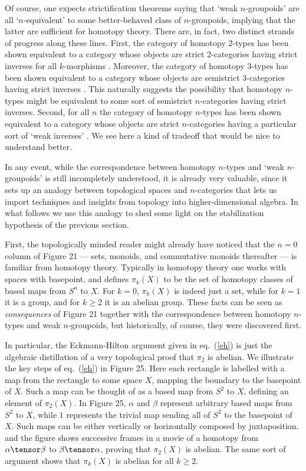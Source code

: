 Of course, one expects strictification theorems saying that `weak
$n$-groupoids' are all `$n$-equivalent' to some better-behaved class of
$n$-groupoids, implying that the latter are sufficient for homotopy
theory.  There are, in fact, two distinct strands of progress along
these lines.  First, the category of homotopy $2$-types has been shown
equivalent to a category whose objects are strict 2-categories having
strict inverses for all $k$-morphisms \cite{BS,MW}.  Moreover, the
category of homotopy 3-types has been shown equivalent to a category
whose objects are semistrict 3-categories having strict inverses
\cite{JT,Leroy}.  This naturally suggests the possibility that homotopy
$n$-types might be equivalent to some sort of semistrict $n$-categories
having strict inverses.  Second, for all $n$ the category of homotopy
$n$-types has been shown equivalent to a category whose objects are
strict $n$-categories having a particular sort of `weak inverses'
\cite{KVinfinity}.  We see here a kind of tradeoff that would be nice to
understand better.

In any event, while the correspondence between homotopy $n$-types
and `weak $n$-groupoids' is still incompletely understood,
it is already very valuable, since it sets up an analogy between
topological spaces and $n$-categories that lets us import
techniques and insights from topology into higher-dimensional
algebra. In what follows we use this analogy to shed some light
on the stabilization hypothesis of the previous section.

First, the topologically minded reader might already have noticed
that the $n = 0$ column of Figure 21 --- sets, monoids, and
commutative monoids thereafter --- is familiar from homotopy
theory.  Typically in homotopy theory one works with spaces with
basepoint, and defines $\pi_k(X)$ to be the set of homotopy
classes of based maps from $S^n$ to $X$.  For $k = 0$, $\pi_k(X)$
is indeed just a set, while for $k = 1$ it is a group, and for $k
\ge 2$ it is an abelian group.  These facts can be seen as {\it
consequences} of Figure 21 together with the correspondence
between homotopy $n$-types and weak $n$-groupoids, but
historically, of course, they were discovered first.

In particular, the Eckmann-Hilton argument given in eq.\
(\ref{eh}) is just the algebraic distillation of a very topological
proof that $\pi_2$ is abelian.  We illustrate the key steps of
eq.\ (\ref{eh}) in Figure 25.  Here each rectangle is
labelled with a map from the rectangle to some space $X$,
mapping the boundary to the basepoint of $X$.  Such a map can be
thought of as a based map from $S^2$ to $X$, defining an element
of $\pi_2(X)$.   In Figure 25, $\alpha$ and $\beta$ represent arbitrary
based maps from $S^2$ to $X$, while $1$ represents the trivial
map sending all of $S^2$ to the basepoint of $X$.  Such maps can
be either vertically or horizontally composed by juxtaposition.
and the figure shows successive frames in a movie of a homotopy
from $\alpha \tensor \beta$ to $\beta \tensor \alpha$, proving
that $\pi_2(X)$ is abelian.   The same sort of argument shows that
$\pi_k(X)$ is abelian for all $k \ge 2$.

